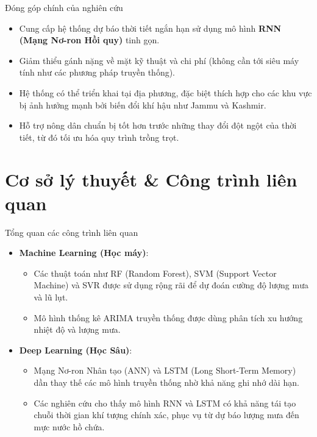 \documentclass[aspectratio=169]{beamer}
\begin{document}
\begin{frame}{Đóng góp chính của nghiên cứu}
    \begin{itemize}
        \item Cung cấp hệ thống dự báo thời tiết ngắn hạn sử dụng mô hình \textbf{RNN (Mạng Nơ-ron Hồi quy)} tinh gọn.
        \item Giảm thiểu gánh nặng về mặt kỹ thuật và chi phí (không cần tới siêu máy tính như các phương pháp truyền thống).
        \item Hệ thống có thể triển khai tại địa phương, đặc biệt thích hợp cho các khu vực bị ảnh hưởng mạnh bởi biến đổi khí hậu như Jammu và Kashmir.
        \item Hỗ trợ nông dân chuẩn bị tốt hơn trước những thay đổi đột ngột của thời tiết, từ đó tối ưu hóa quy trình trồng trọt.
    \end{itemize}
\end{frame}

\section{Cơ sở lý thuyết \& Công trình liên quan}

\begin{frame}{Tổng quan các công trình liên quan}
    \begin{itemize}
        \item \textbf{Machine Learning (Học máy)}:
        \begin{itemize}
            \item Các thuật toán như RF (Random Forest), SVM (Support Vector Machine) và SVR được sử dụng rộng rãi để dự đoán cường độ lượng mưa và lũ lụt.
            \item Mô hình thống kê ARIMA truyền thống được dùng phân tích xu hướng nhiệt độ và lượng mưa.
        \end{itemize}
        \item \textbf{Deep Learning (Học Sâu)}:
        \begin{itemize}
            \item Mạng Nơ-ron Nhân tạo (ANN) và LSTM (Long Short-Term Memory) dần thay thế các mô hình truyền thống nhờ khả năng ghi nhớ dài hạn.
            \item Các nghiên cứu cho thấy mô hình RNN và LSTM có khả năng tái tạo chuỗi thời gian khí tượng chính xác, phục vụ từ dự báo lượng mưa đến mực nước hồ chứa.
        \end{itemize}
    \end{itemize}
\end{frame}
\end{document}
